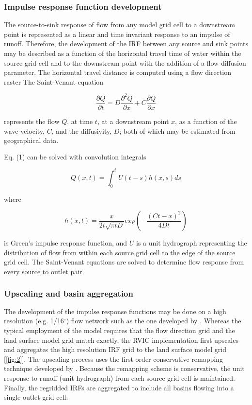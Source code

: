 \documentclass[jgrga, draft]{agutex}
\begin{document}
\begin{article}
\subsubsection{Impulse response function development}
\label{sec:irfs}

The source-to-sink response of flow from any model grid cell to a downstream point is represented as a linear and time invariant response to an impulse of runoff.
Therefore, the development of the IRF between any source and sink points may be described as a function of the horizontal travel time of water within the source grid cell and to the downstream point with the addition of a flow diffusion parameter.
The horizontal travel distance is computed using a flow direction raster \citep[e.g.][]{Wu_2011}
The Saint-Venant equation

 \begin{equation}
     \frac{\partial Q}{\partial t} = D \frac{\partial^2 Q}{\partial x} + C \frac{\partial Q}{\partial x}
 \end{equation}

represents the flow $Q$, at time $t$, at a downstream point $x$, as a function of the wave velocity, $C$, and the diffusivity, $D$; both of which may be estimated from geographical data.

Eq. (1) can be solved with convolution integrals

 \begin{equation}
	Q(x,t) = \int_0^t U(t-s)h(x,s)ds
 \end{equation}

where

 \begin{equation}
	h(x, t) = \frac{x}{2t\sqrt{\pi tD}}exp\left(-\frac{(Ct-x)^2}{4Dt}\right)
 \end{equation}

is Green’s impulse response function, and $U$ is a unit hydrograph representing the distribution of flow from within each source grid cell to the edge of the source grid cell.
The Saint-Venant equations are solved to determine flow response from every source to outlet pair.

\subsubsection{Upscaling and basin aggregation}
\label{sec:remap}

The development of the impulse response functions may be done on a high resolution (e.g. 1/16$^{\circ}$) flow network such as the one developed by \citet{Wu_2011}.
Whereas the typical employment of the \citet{Lohmann_1996} model requires that the flow direction grid and the land surface model grid match exactly, the RVIC implementation first upscales and aggregates the high resolution IRF grid to the land surface model grid [\ref{fig:2}].
The upscaling process uses the first-order conservative remapping technique developed by \citep{Jones_1999}.
Because the remapping scheme is conservative, the unit response to runoff (unit hydrograph) from each source grid cell is maintained.
Finally, the regridded IRFs are aggregated to include all basins flowing into a single outlet grid cell.


\end{article}
\end{document}
